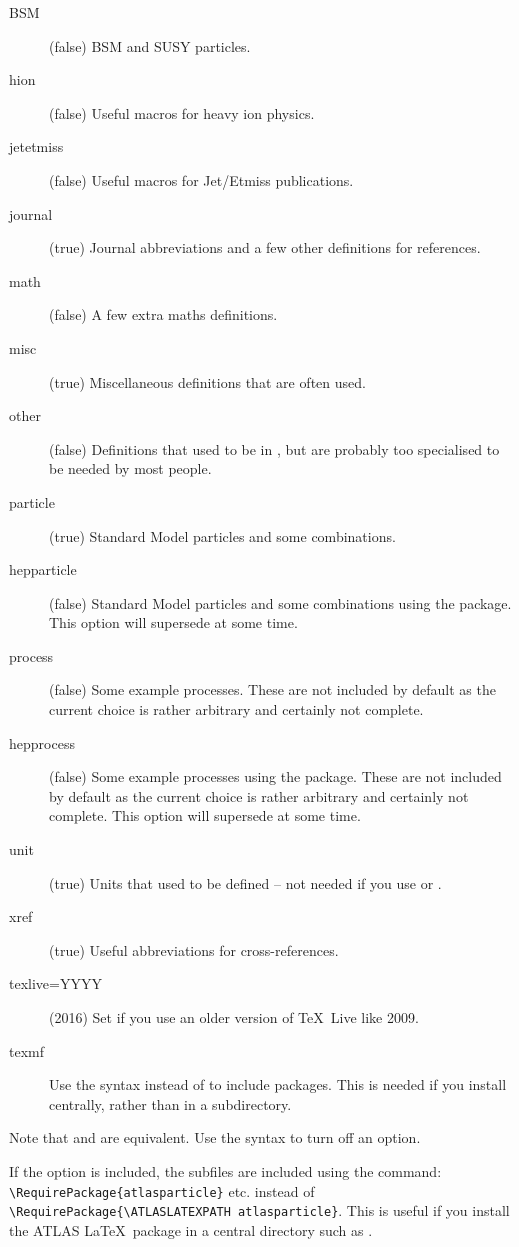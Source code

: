 \begin{description}
\item[BSM](false) BSM and SUSY particles.
\item[hion](false) Useful macros for heavy ion physics.
\item[jetetmiss](false) Useful macros for Jet/Etmiss publications.
\item[journal](true) Journal abbreviations and a few other definitions for references.
\item[math](false) A few extra maths definitions.
\item[misc](true) Miscellaneous definitions that are often used.
\item[other](false) Definitions that used to be in ,
  but are probably too specialised to be needed by most people.
\item[particle](true) Standard Model particles and some combinations.
\item[hepparticle](false) Standard Model particles and some combinations using the  package.
  This option will supersede  at some time.
\item[process](false) Some example processes.
  These are not included by default as the current choice is rather arbitrary
  and certainly not complete.
\item[hepprocess](false) Some example processes using the  package.
  These are not included by default as the current choice is rather arbitrary
  and certainly not complete.
  This option will supersede  at some time.
\item[unit](true) Units that used to be defined -- not needed if you use  or .
\item[xref](true) Useful abbreviations for cross-references.
\item[texlive=YYYY](2016) Set if you use an older version of \TeX\ Live like 2009.
\item[texmf] Use the syntax 
  instead of  to include packages.
  This is needed if you install  centrally,
  rather than in a  subdirectory.
\end{description}
Note that  and  are equivalent.
Use the syntax  to turn off an option.

If the  option  is included, the subfiles are included using the command:
\verb|\RequirePackage{atlasparticle}| etc. instead of \verb|\RequirePackage{\ATLASLATEXPATH atlasparticle}|.
This is useful if you install the ATLAS \LaTeX\ package in a central directory such as .

